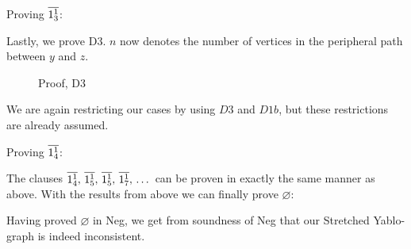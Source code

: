 Proving $\ol{1^1_3}$:
\begin{prooftree*}
  \Hypo{\dots}
\end{prooftree*}
Lastly, we prove D3.
$n$ now denotes the number of vertices in the peripheral path between $y$ and $z$.\par
\begin{figure}[!h]
  \centering
  \begin{prooftree*}
  \end{prooftree*}
  \caption{Proof, D3}
  \label{fig:proof_d3}
\end{figure}
\FloatBarrier
We are again restricting our cases by using $D3$ and $D1b$, but these restrictions are already assumed.

Proving $\ol{1^1_4}$:
\begin{prooftree*}
  \Hypo{\dots}
\end{prooftree*}

The clauses $\ol{1^1_4},\,\ol{1^1_5},\,\ol{1^1_5},\,\ol{1^1_7},\,\dots$ can be proven in exactly the same manner as above.
With the results from above we can finally prove $\varnothing$:
\begin{prooftree*}
  \Hypo{\dots}
\end{prooftree*}

Having proved $\varnothing$ in Neg, we get from soundness of Neg that our Stretched Yablo-graph is indeed inconsistent.
